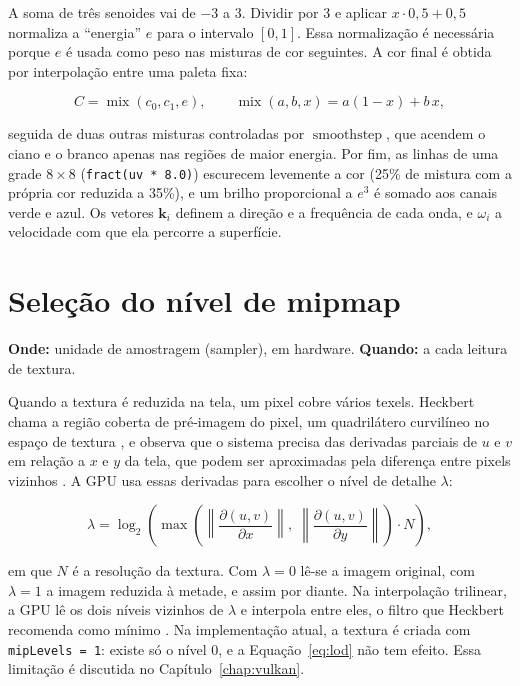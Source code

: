 A soma de três senoides vai de \(-3\) a \(3\). Dividir por 3 e aplicar \(x\cdot0{,}5+0{,}5\) normaliza a ``energia'' \(e\) para o intervalo \([0,1]\). Essa normalização é necessária porque \(e\) é usada como peso nas misturas de cor seguintes. A cor final é obtida por interpolação entre uma paleta fixa:

\begin{equation}
C = \operatorname{mix}(c_0, c_1, e),\qquad
\operatorname{mix}(a,b,x)=a(1-x)+b\,x,
\label{eq:mix}
\end{equation}

seguida de duas outras misturas controladas por \(\operatorname{smoothstep}\), que acendem o ciano e o branco apenas nas regiões de maior energia. Por fim, as linhas de uma grade \(8\times8\) (\texttt{fract(uv * 8.0)}) escurecem levemente a cor (25\% de mistura com a própria cor reduzida a 35\%), e um brilho proporcional a \(e^3\) é somado aos canais verde e azul. Os vetores \(\mathbf{k}_i\) definem a direção e a frequência de cada onda, e \(\omega_i\) a velocidade com que ela percorre a superfície.

\section{Seleção do nível de mipmap}

\textbf{Onde:} unidade de amostragem (sampler), em hardware. \textbf{Quando:} a cada leitura de textura.

Quando a textura é reduzida na tela, um pixel cobre vários texels. Heckbert chama a região coberta de pré-imagem do pixel, um quadrilátero curvilíneo no espaço de textura \cite[p.~7]{heckbert1986}, e observa que o sistema precisa das derivadas parciais de \(u\) e \(v\) em relação a \(x\) e \(y\) da tela, que podem ser aproximadas pela diferença entre pixels vizinhos \cite[p.~11]{heckbert1986}. A GPU usa essas derivadas para escolher o nível de detalhe \(\lambda\):

\begin{equation}
\lambda=\log_2\!\left(\max\!\left(
\left\lVert \frac{\partial (u,v)}{\partial x}\right\rVert,\;
\left\lVert \frac{\partial (u,v)}{\partial y}\right\rVert
\right)\cdot N\right),
\label{eq:lod}
\end{equation}

em que \(N\) é a resolução da textura. Com \(\lambda=0\) lê-se a imagem original, com \(\lambda=1\) a imagem reduzida à metade, e assim por diante. Na interpolação trilinear, a GPU lê os dois níveis vizinhos de \(\lambda\) e interpola entre eles, o filtro que Heckbert recomenda como mínimo \cite[p.~11]{heckbert1986}. Na implementação atual, a textura é criada com \texttt{mipLevels = 1}: existe só o nível 0, e a Equação~\eqref{eq:lod} não tem efeito. Essa limitação é discutida no Capítulo~\ref{chap:vulkan}.

